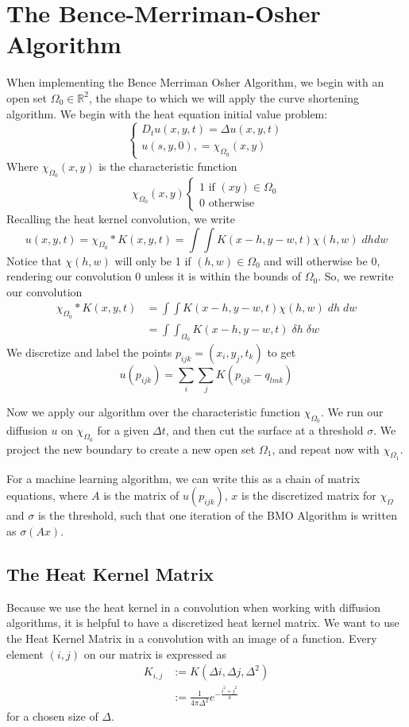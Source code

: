 \documentclass[12pt]{article}
\theoremstyle{plain}
\theoremstyle{definition}
\theoremstyle{remark}
\begin{document}
\section{The Bence-Merriman-Osher Algorithm} 
When implementing the Bence Merriman Osher Algorithm, we begin with an open set $\Omega_0 \in \mathbb{R}^2$, the shape to which we will apply the curve shortening algorithm. We begin with the heat equation initial value problem: 
$$\begin{cases}                 
    D_tu(x,y,t)=\Delta u(x,y,t) \\
    u(s, y, 0), = \chi_{\Omega_0}(x, y)
\end{cases}$$ 
Where $\chi_{\Omega_0}(x, y)$ is the characteristic function 
$$\chi_{\Omega_0}(x, y) \begin{cases}
    1 \text{ if } (xy) \in \Omega_0\\
    0 \text{ otherwise}
\end{cases}$$
Recalling the heat kernel convolution, we write $$u(x, y, t) = \chi_{\Omega_0} * K(x, y, t) = \int \int K(x-h, y-w, t)\chi(h, w)\; dh dw$$
Notice that $\chi(h, w)$ will only be 1 if $(h, w) \in \Omega_0$ and will otherwise be 0, rendering our convolution 0 unless it is within the bounds of $\Omega_0$. So, we rewrite our convolution 
\begin{align*}
    \chi_{\Omega_0} * K(x, y, t) &= \int \int K(x-h, y-w, t)\chi(h, w)\; dh \;dw\\
    &=\int\int_{\Omega_0} K(x-h, y-w, t) \; \delta h \; \delta w
\end{align*}
We discretize and label the points $p_{ijk} = (x_i, y_j, t_k)$ to get $$u(p_{ijk})=\sum_i\sum_j K(p_{ijk}-q_{lmk})$$

Now we apply our algorithm over the characteristic function $\chi_{\Omega_0}$. We run our diffusion $u$ on $\chi_{\Omega_0}$ for a given $\Delta t$, and then cut the surface at a threshold $\sigma$. We project the new boundary to create a new open set $\Omega_1$, and repeat now with $\chi_{\Omega_1}$.

For a machine learning algorithm, we can write this as a chain of matrix equations, where $A$ is the matrix of $u(p_{ijk})$, $x$ is the discretized matrix for $\chi_\Omega$ and $\sigma$ is the threshold, such that one iteration of the BMO Algorithm is written as $\sigma(Ax)$.
     
\subsection{The Heat Kernel Matrix}
Because we use the heat kernel in a convolution when working with diffusion algorithms, it is helpful to have a discretized heat kernel matrix.
We want to use the Heat Kernel Matrix in a convolution with an image of a function.  Every element $(i, j)$ on our matrix is expressed as 
\begin{align*}
    K_{i, j} &:= K(\Delta i, \Delta j, \Delta^2)\\
    &:=\frac{1}{4\pi\Delta^2}e^{-\frac{i^2+j^2}{4}}
\end{align*}
  for a chosen size of $\Delta$. 
  
\end{document}
